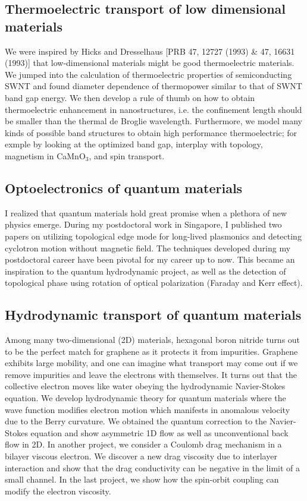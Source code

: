\documentclass[a4paper,11pt]{article}
\begin{document}
\subsection*{Thermoelectric transport of low dimensional materials}
We were inspired by Hicks and Dresselhaus [PRB 47, 12727 (1993) \& 47,
  16631 (1993)] that low-dimensional materials might be good
thermoelectric materials. We jumped into the calculation of
thermoelectric properties of semiconducting SWNT and found diameter
dependence of thermopower similar to that of SWNT band gap energy. We then
develop a rule of thumb on how to obtain thermoelectric enhancement in
nanostructures, i.e. the confinement length should be smaller than the
thermal de Broglie wavelength. Furthermore, we model many kinds of
possible band structures to obtain high performance thermoelectric;
for exmple by looking at the optimized band gap, interplay with
topology, magnetism in CaMnO$_3$, and spin transport. 
\subsection*{Optoelectronics of quantum materials}
I realized that quantum materials hold great promise when a plethora of
new physics emerge. During my postdoctoral work in Singapore, I published two
papers on utilizing topological edge mode for long-lived plasmonics
and detecting cyclotron motion without magnetic field. The techniques
developed during my postdoctoral career have been pivotal for my career up to
now. This became an inspiration to the quantum hydrodynamic project, as
well as the detection of topological phase using rotation of optical
polarization (Faraday and Kerr effect). 
\subsection*{Hydrodynamic transport of quantum materials}
Among many two-dimensional (2D) materials, hexagonal
boron nitride turns out to be the perfect match for graphene as it
protects it from impurities. Graphene exhibits large mobility, and one
can imagine what transport may come out if we remove impurities and
leave the electrons with themselves. It turns out that the collective electron
moves like water obeying the hydrodynamic Navier-Stokes equation. We
develop hydrodynamic theory for quantum materials where the
wave function modifies electron motion which manifests in anomalous
velocity due to the Berry curvature. We obtained the quantum
correction to the Navier-Stokes equation and show asymmetric 1D flow
as well as unconventional back flow in 2D. In another project, we
consider a Coulomb drag mechanism in a bilayer viscous electron. We
discover a new drag viscosity due to interlayer interaction and show
that the drag conductivity can be negative in the limit of a small
channel. In the last project, we show how the spin-orbit coupling can
modify the electron viscosity. 
\end{document}
